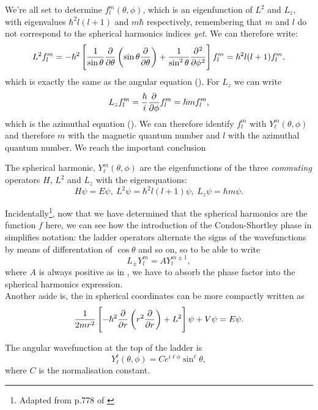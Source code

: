 We're all set to determine $f^m_l(\theta,\phi)$, which is an eigenfunction of 
$L^2$ and $L_z$, with eigenvalues $\hbar^2l(l+1)$ and $m\hbar$ respectively, 
remembering that $m$ and $l$ do not correspond to the spherical harmonics indices 
\textit{yet}. We can therefore write: 
\begin{equation}
\label{fml1}
L^2f^m_l=-\hbar^2\lf[\frac{1}{\sin\theta}\diffp{}{\theta}\lf(\sin\theta\diffp{}{\theta} \rt)+\frac{1}{\sin^2\theta}\diffp[2]{}{\phi} \rt]f^m_l=\hbar^2l(l+1)f^m_l, 
\end{equation}
which is exactly the same as the angular equation (). 
For $L_z$ we can write
\begin{equation}
\label{fml2}
L_zf^m_l=\frac{\hbar}{i}\diffp{}{\phi}f^m_l=\hbar mf^m_l, 
\end{equation}
which is the azimuthal equation (). 
We can therefore identify $f^m_l$ with $Y^m_{\ell}(\theta,\phi)$ and therefore 
$m$ with the magnetic quantum number and $l$ with the azimuthal quantum number. 
We reach the important conclusion
\begin{thrm}
\label{angmom_eigval}
The spherical harmonic, $Y^m_{\ell}(\theta,\phi)$ are the eigenfunctions of 
the three \textit{commuting} operators $H$, $L^2$ and $L_z$ with the eigenequations: 
\begin{equation}
H\psi=E\psi,\ L^2\psi=\hbar^2l(l+1)\psi,\ L_z\psi=\hbar m\psi. 
\end{equation}
\end{thrm}
Incidentally\footnote{Adapted from p.778 of \cite{arfken}}, now that we have 
determined that the spherical harmonics are the 
function $f$ here, we can see how the introduction of the Condon-Shortley phase 
in  simplifies notation: the ladder operators alternate the signs 
of the wavefunctions by means of differentation of $\cos\theta$ and so on, so 
to be able to write
\begin{equation}
L_{\pm}Y^m_l=AY^{m\pm1}_l, 
\end{equation}
where $A$ is always positive as in , we have to absorb the 
phase factor into the spherical harmonics expression. \\
Another aside is, the \sch in spherical coordinates can be more compactly written as
\begin{equation}
\frac{1}{2mr^2}\lf[-\hbar^2\diffp{}{r}\lf(r^2\diffp{}{r} \rt)+L^2 \rt]\psi+V\psi=E\psi. 
\end{equation}
\begin{coro}
The angular wavefunction at the top of the ladder is
\begin{equation}
Y^{\ell}_{\ell}(\theta,\phi)=Ce^{i\ell\phi}\sin^{\ell}\theta, 
\end{equation}
where $C$ is the normalisation constant. 
\end{coro}
